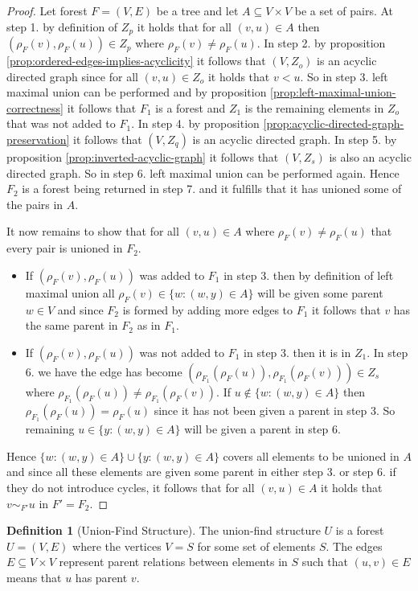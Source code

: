 \documentclass[a4paper,12pt]{article}
\theoremstyle{definition}
\newtheorem{definition}{Definition}[section]
\begin{document}
\begin{proof}
    Let forest $F = (V, E)$ be a tree and let $A \subseteq V \times V$ be a set
    of pairs. At step 1. by definition of $Z_p$ it holds that for all $(v, u)
    \in A$ then $(\rho_F(v), \rho_F(u)) \in Z_p$ where $\rho_F(v) \neq
    \rho_F(u)$. In step 2. by proposition
    \ref{prop:ordered-edges-implies-acyclicity} it follows that $(V, Z_o)$ is an
    acyclic directed graph since for all $(v, u) \in Z_o$ it holds that $v < u$.
    So in step 3. left maximal union can be performed and by proposition
    \ref{prop:left-maximal-union-correctness} it follows that $F_1$ is a forest
    and $Z_1$ is the remaining elements in $Z_o$ that was not added to $F_1$. In
    step 4. by proposition \ref{prop:acyclic-directed-graph-preservation} it
    follows that $(V, Z_q)$ is an acyclic directed graph. In step 5. by
    proposition \ref{prop:inverted-acyclic-graph} it follows that $(V, Z_s)$ is
    also an acyclic directed graph. So in step 6. left maximal union can be
    performed again. Hence $F_2$ is a forest being returned in step 7. and it
    fulfills that it has unioned some of the pairs in $A$.

    It now remains to show that for all $(v, u) \in A$ where $\rho_F(v) \neq
    \rho_F(u)$ that every pair is unioned in $F_2$.
    \begin{itemize}
        \item If $(\rho_F(v), \rho_F(u))$ was added to $F_1$ in step 3. then by
         definition of left maximal union all $\rho_F(v) \in \{w : (w, y) \in
         A\}$ will be given some parent $w \in V$ and since $F_2$ is formed by
         adding more edges to $F_1$ it follows that $v$ has the same parent in
         $F_2$ as in $F_1$.
        \item If $(\rho_F(v), \rho_F(u))$ was not added to $F_1$ in step 3. then
        it is in $Z_1$. In step 6. we have the edge has become
        $(\rho_{F_1}(\rho_{F}(u)), \rho_{F_1}(\rho_{F}(v))) \in Z_s$ where
        $\rho_{F_1}(\rho_F(u)) \neq \rho_{F_1}(\rho_{F}(v))$. If $u \notin \{w :
        (w, y) \in A\}$ then $\rho_{F_1}(\rho_{F}(u)) = \rho_{F}(u)$ since it
        has not been given a parent in step 3. So remaining $u \in \{y : (w, y)
        \in A\}$ will be given a parent in step 6.
    \end{itemize}
    Hence $\{w : (w, y) \in A\} \cup \{y : (w, y) \in A\}$ covers all elements
    to be unioned in $A$ and since all these elements are given some parent in
    either step 3. or step 6. if they do not introduce cycles, it follows that
    for all $(v, u) \in A$ it holds that $v \sim_{F'} u$ in $F' = F_2$.
\end{proof}

\begin{definition}[Union-Find Structure]
    The union-find structure $U$ is a forest $U = (V, E)$ where the vertices $V
    = S$ for some set of elements $S$. The edges $E \subseteq V \times V$
    represent parent relations between elements in $S$ such that $(u, v) \in E$
    means that $u$ has parent $v$.
\end{definition}
\end{document}
